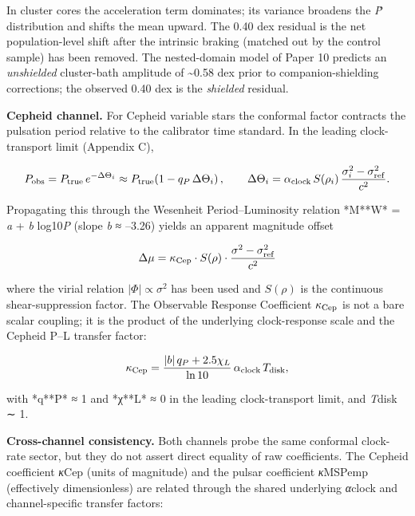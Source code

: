\documentclass[
]{article}
\begin{document}
In cluster cores the acceleration term dominates; its variance broadens
the \textbar{}\emph{Ṗ}\textbar{} distribution and shifts the mean
upward. The 0.40 dex residual is the net population-level shift after
the intrinsic braking (matched out by the control sample) has been
removed. The nested-domain model of Paper 10 predicts an
\emph{unshielded} cluster-bath amplitude of \textasciitilde0.58 dex
prior to companion-shielding corrections; the observed 0.40 dex is the
\emph{shielded} residual.

\textbf{Cepheid channel.} For Cepheid variable stars the conformal
factor contracts the pulsation period relative to the calibrator time
standard. In the leading clock-transport limit (Appendix C),

\begin{equation}
P_{\rm obs} = P_{\rm true}\,e^{-\Delta\Theta_i} \approx P_{\rm true}\!\left(1 - q_P\,\Delta\Theta_i\right) ,
\qquad \Delta\Theta_i = \alpha_{\rm clock}\,S(\rho_i)\,\frac{\sigma_i^2 - \sigma_{\rm ref}^2}{c^2} .
\end{equation}

Propagating this through the Wesenheit Period--Luminosity relation
*M**W* = \emph{a} + \emph{b} log10\emph{P} (slope \emph{b} ≈ --3.26)
yields an apparent magnitude offset

\begin{equation}
\Delta\mu = \kappa_{\rm Cep} \cdot S(\rho) \cdot \frac{\sigma^2 - \sigma_{\rm ref}^2}{c^2}
\label{eq:magnitude_offset}
\end{equation}

where the virial relation \(|\Phi| \propto \sigma^2\) has been used and
\(S(\rho)\) is the continuous shear-suppression factor. The Observable
Response Coefficient \(\kappa_{\rm Cep}\) is not a bare scalar coupling;
it is the product of the underlying clock-response scale and the Cepheid
P--L transfer factor:

\begin{equation}
\kappa_{\rm Cep} = \frac{|b|\,q_P + 2.5\chi_L}{\ln 10}\,\alpha_{\rm clock}\,T_{\rm disk} ,
\end{equation}

with *q**P* ≈ 1 and *χ**L* ≈ 0 in the leading clock-transport limit, and
\emph{T}disk ∼ 1.

\textbf{Cross-channel consistency.} Both channels probe the same
conformal clock-rate sector, but they do not assert direct equality of
raw coefficients. The Cepheid coefficient \emph{κ}Cep (units of
magnitude) and the pulsar coefficient \emph{κ}MSPemp (effectively
dimensionless) are related through the shared underlying \emph{α}clock
and channel-specific transfer factors:
\end{document}
